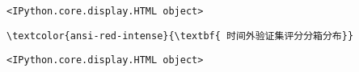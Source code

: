 \documentclass[11pt]{article}
\begin{document}
    
    \begin{verbatim}
<IPython.core.display.HTML object>
    \end{verbatim}

    
    \begin{Verbatim}[commandchars=\\\{\}]
\textcolor{ansi-red-intense}{\textbf{ 时间外验证集评分分箱分布}}

    \end{Verbatim}

    
    \begin{verbatim}
<IPython.core.display.HTML object>
    \end{verbatim}

    
    \begin{center}
    \end{center}
    { \hspace*{\fill} \\}
    
    \begin{center}
    \end{center}
    { \hspace*{\fill} \\}
    

    
    
    
    
\end{document}
